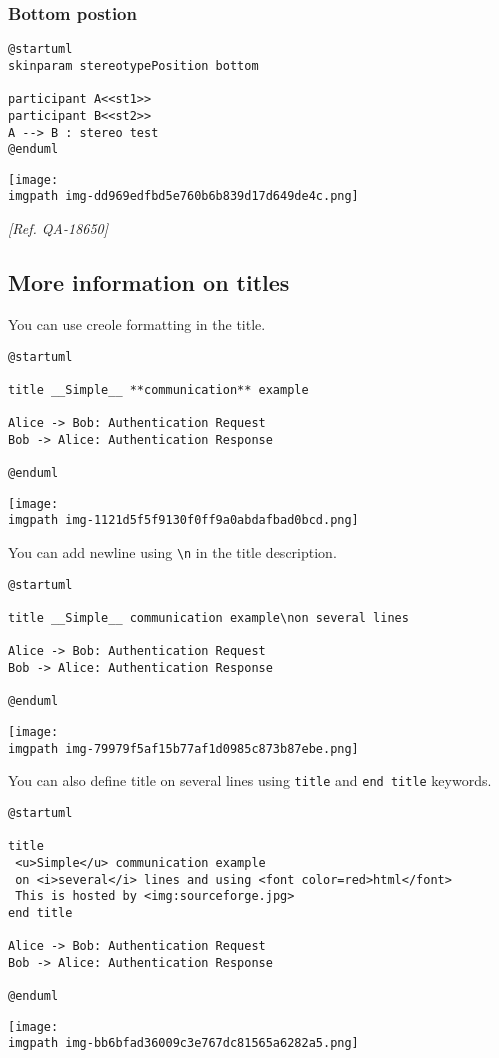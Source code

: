 \subsubsection{Bottom postion}
\begin{verbatim}
@startuml
skinparam stereotypePosition bottom

participant A<<st1>>
participant B<<st2>>
A --> B : stereo test
@enduml
\end{verbatim}
\begin{center}
\texttt{[image: \\imgpath img-dd969edfbd5e760b6b839d17d649de4c.png]}
\end{center}


\textit{[Ref. QA-18650]}
%
%
\subsection{More information on titles}


You can use creole formatting in the title.


\begin{verbatim}
@startuml

title __Simple__ **communication** example

Alice -> Bob: Authentication Request
Bob -> Alice: Authentication Response

@enduml
\end{verbatim}
\begin{center}
\texttt{[image: \\imgpath img-1121d5f5f9130f0ff9a0abdafbad0bcd.png]}
\end{center}
You can add newline using \texttt{\textbackslash n} in the title description.
\begin{verbatim}
@startuml

title __Simple__ communication example\non several lines

Alice -> Bob: Authentication Request
Bob -> Alice: Authentication Response

@enduml
\end{verbatim}
\begin{center}
\texttt{[image: \\imgpath img-79979f5af15b77af1d0985c873b87ebe.png]}
\end{center}
You can also define title on several lines using \texttt{title}
and \texttt{end title} keywords.
\begin{verbatim}
@startuml

title
 <u>Simple</u> communication example
 on <i>several</i> lines and using <font color=red>html</font>
 This is hosted by <img:sourceforge.jpg>
end title

Alice -> Bob: Authentication Request
Bob -> Alice: Authentication Response

@enduml
\end{verbatim}
\begin{center}
\texttt{[image: \\imgpath img-bb6bfad36009c3e767dc81565a6282a5.png]}
\end{center}


